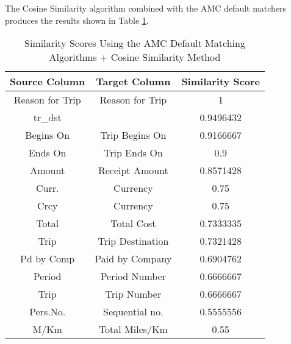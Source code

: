 The Cosine Similarity algorithm combined with the AMC default matchers produces the results shown in Table \ref{tab:Similarity_Scores_Using_the_AMC_Default_Matching_Algorithms_+_Cosine_Similarity_Method}.

\begin{table}[ht]
\centering
\begin{tabular}{|c|c|c|}
\hline
{\bf Source Column} & {\bf Target Column} & {\bf Similarity Score} \\ \hline
Reason for Trip                & Reason for Trip                & 1                                 \\ \hline
tr\_dst                        &                                & 0.9496432                         \\ \hline
Begins On                      & Trip Begins On                 & 0.9166667                         \\ \hline
Ends On                        & Trip Ends On                   & 0.9                               \\ \hline
Amount                         & Receipt Amount                 & 0.8571428                         \\ \hline
Curr.                          & Currency                       & 0.75                              \\ \hline
Crcy                           & Currency                       & 0.75                              \\ \hline
Total                          & Total Cost                     & 0.7333335                         \\ \hline
Trip                           & Trip Destination               & 0.7321428                         \\ \hline
Pd by Comp                     & Paid by Company                & 0.6904762                         \\ \hline
Period                         & Period Number                  & 0.6666667                         \\ \hline
Trip                           & Trip Number                    & 0.6666667                         \\ \hline
Pers.No.                       & Sequential no.                 & 0.5555556                         \\ \hline
M/Km                           & Total Miles/Km                 & 0.55                              \\ \hline
\end{tabular}
\caption{Similarity Scores Using the AMC Default Matching Algorithms + Cosine Similarity Method}
\label{tab:Similarity_Scores_Using_the_AMC_Default_Matching_Algorithms_+_Cosine_Similarity_Method}
\end{table}


